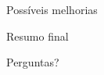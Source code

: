 \documentclass{beamer}
\begin{document}
\begin{frame}{Possíveis melhorias}
    
\end{frame}

\begin{frame}{Resumo final}
    
\end{frame}

\begin{frame}
    \begin{center}
        \centering
        \Large{Perguntas?}
    \end{center}
\end{frame}
\end{document}
